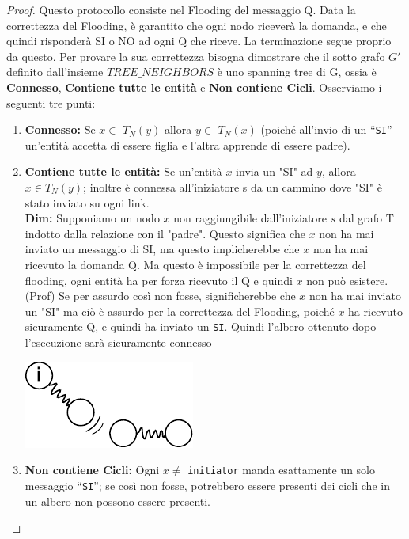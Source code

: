 \begin{proof}
    Questo protocollo consiste nel Flooding del messaggio Q. Data la correttezza
    del Flooding, è garantito che ogni nodo riceverà la domanda, e che quindi
    risponderà SI o NO ad ogni Q che riceve. La terminazione segue proprio da
    questo. Per provare la sua correttezza bisogna dimostrare che il sotto grafo
    $G'$ definito dall'insieme $TREE\_NEIGHBORS$ è uno spanning tree di G, ossia
    è \textbf{Connesso}, \textbf{Contiene tutte le entità} e \textbf{Non
        contiene Cicli}. Osserviamo i seguenti tre punti:
    \begin{enumerate}
        \item \textbf{Connesso:} Se $x \in$ $T_N(y)$ allora $y \in$ $T_N(x)$
              (poiché all'invio di un ``\texttt{SI}'' un'entità accetta di
              essere figlia e l'altra apprende di essere padre).
        \item \textbf{Contiene tutte le entità:} Se un'entità $x$ invia un "SI"
              ad $y$, allora $x \in T_N(y)$; inoltre è connessa all'iniziatore s
              da un cammino dove "SI" è stato inviato su ogni link. \\
              \textbf{Dim:} Supponiamo un nodo $x$ non raggiungibile
              dall'iniziatore $s$ dal grafo T indotto dalla relazione con il
              "padre". Questo significa che $x$ non ha mai inviato un messaggio
              di SI, ma questo implicherebbe che $x$ non ha mai ricevuto la
              domanda Q. Ma questo è impossibile per la correttezza del
              flooding, ogni entità ha per forza ricevuto il Q e quindi $x$ non
              può esistere.\\
              (Prof) Se per assurdo così non fosse, significherebbe che $x$ non
              ha mai inviato un "SI" ma ciò è assurdo per la correttezza del
              Flooding, poiché $x$ ha ricevuto sicuramente Q, e quindi ha
              inviato un \texttt{SI}. Quindi l'albero ottenuto dopo l'esecuzione
              sarà sicuramente connesso
              \begin{center}
                  \includegraphics[scale=1]{images/n_21}
              \end{center}
        \item \textbf{Non contiene Cicli:} Ogni $x \neq $ \texttt{initiator}
              manda esattamente un solo messaggio ``\texttt{SI}''; se così non
              fosse, potrebbero essere presenti dei cicli che in un albero non
              possono essere presenti.
    \end{enumerate}
\end{proof}

